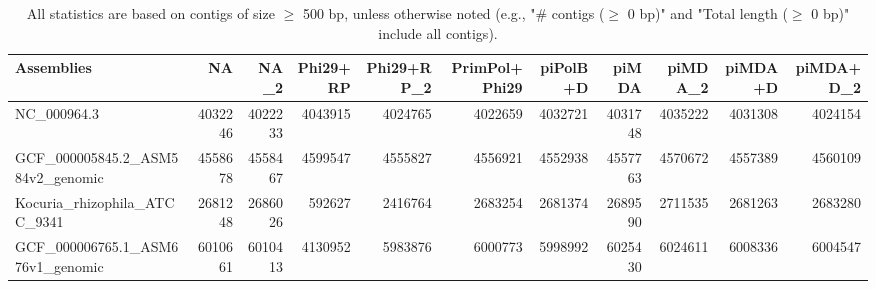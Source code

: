 \documentclass[12pt,a4paper]{article}
\begin{document}
\begin{table}[ht]
\begin{center}
\caption{All statistics are based on contigs of size $\geq$ 500 bp, unless otherwise noted (e.g., "\# contigs ($\geq$ 0 bp)" and "Total length ($\geq$ 0 bp)" include all contigs).}
\begin{tabular}{|l*{10}{|r}|}
\hline
Assemblies & NA & NA\_2 & Phi29+RP & Phi29+RP\_2 & PrimPol+Phi29 & piPolB+D & piMDA & piMDA\_2 & piMDA+D & piMDA+D\_2 \\ \hline
NC\_000964.3 & 4032246 & 4022233 & 4043915 & 4024765 & 4022659 & 4032721 & 4031748 & 4035222 & 4031308 & 4024154 \\ \hline
GCF\_000005845.2\_ASM584v2\_genomic & 4558678 & 4558467 & 4599547 & 4555827 & 4556921 & 4552938 & 4557763 & 4570672 & 4557389 & 4560109 \\ \hline
Kocuria\_rhizophila\_ATCC\_9341 & 2681248 & 2686026 & 592627 & 2416764 & 2683254 & 2681374 & 2689590 & 2711535 & 2681263 & 2683280 \\ \hline
GCF\_000006765.1\_ASM676v1\_genomic & 6010661 & 6010413 & 4130952 & 5983876 & 6000773 & 5998992 & 6025430 & 6024611 & 6008336 & 6004547 \\ \hline
\end{tabular}
\end{center}
\end{table}
\end{document}
